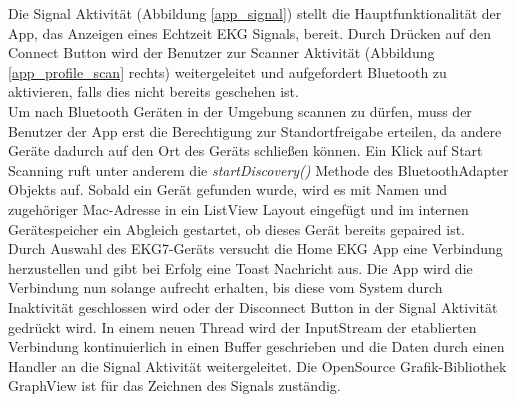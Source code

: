 Die Signal Aktivität (Abbildung \ref{app_signal}) stellt die Hauptfunktionalität der App, das Anzeigen eines Echtzeit EKG Signals, bereit. Durch Drücken auf den Connect Button wird der Benutzer zur Scanner Aktivität (Abbildung \ref{app_profile_scan} rechts) weitergeleitet und aufgefordert Bluetooth zu aktivieren, falls dies nicht bereits geschehen ist. \\
Um nach Bluetooth Geräten in der Umgebung scannen zu dürfen, muss der Benutzer der App erst die Berechtigung zur Standortfreigabe erteilen, da andere Geräte dadurch auf den Ort des Geräts schließen können.
Ein Klick auf Start Scanning ruft unter anderem die \textit{startDiscovery()} Methode des BluetoothAdapter Objekts auf. Sobald ein Gerät gefunden wurde, wird es mit Namen und zugehöriger Mac-Adresse in ein ListView Layout eingefügt und im internen Gerätespeicher ein Abgleich gestartet, ob dieses Gerät bereits gepaired ist. \\
Durch Auswahl des EKG7-Geräts versucht die Home EKG App eine Verbindung herzustellen und gibt bei Erfolg eine Toast Nachricht aus. Die App wird die Verbindung nun solange aufrecht erhalten, bis diese vom System durch Inaktivität geschlossen wird oder der Disconnect Button in der Signal Aktivität gedrückt wird. In einem neuen Thread wird der InputStream der etablierten Verbindung kontinuierlich in einen Buffer geschrieben und die Daten durch einen Handler an die Signal Aktivität weitergeleitet. Die OpenSource Grafik-Bibliothek GraphView ist für das Zeichnen des Signals zuständig.